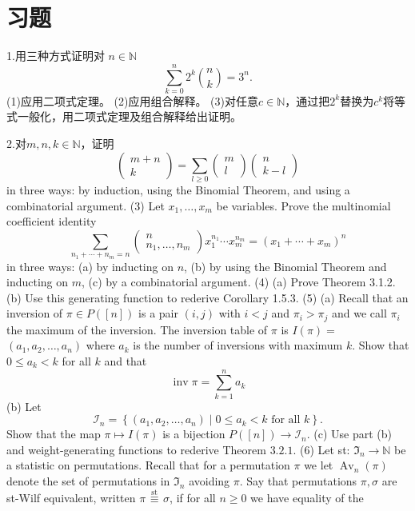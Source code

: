 \documentclass[a4paper,12pt]{ctexbook}
\begin{document}
\section{习题}
1.用三种方式证明对 $n \in \mathbb{N}$
$$
\sum_{k=0}^{n} 2^{k}\binom{n}{k}=3^{n}.
$$
(1)应用二项式定理。
(2)应用组合解释。
(3)对任意$c \in \mathbb{N}$，通过把$2^{k}$替换为$c^{k}$将等式一般化，用二项式定理及组合解释给出证明。

2.对$m, n, k \in \mathbb{N}$，证明
$$
\left(\begin{array}{c}
m+n \\
k
\end{array}\right)=\sum_{l \geq 0}\left(\begin{array}{c}
m \\
l
\end{array}\right)\left(\begin{array}{c}
n \\
k-l
\end{array}\right)
$$
in three ways: by induction, using the Binomial Theorem, and using a combinatorial argument.
(3) Let $x_{1}, \ldots, x_{m}$ be variables. Prove the multinomial coefficient identity
$$
\sum_{n_{1}+\cdots+n_{m}=n}\left(\begin{array}{c}
n \\
n_{1}, \ldots, n_{m}
\end{array}\right) x_{1}^{n_{1}} \cdots x_{m}^{n_{m}}=\left(x_{1}+\cdots+x_{m}\right)^{n}
$$
in three ways:
(a) by inducting on $n$,
(b) by using the Binomial Theorem and inducting on $m$,
(c) by a combinatorial argument.
(4) (a) Prove Theorem 3.1.2.
(b) Use this generating function to rederive Corollary 1.5.3.
(5) (a) Recall that an inversion of $\pi \in P([n])$ is a pair $(i, j)$ with $i<j$ and $\pi_{i}>\pi_{j}$ and we call $\pi_{i}$ the maximum of the inversion. The inversion table of $\pi$ is $I(\pi)=$ $\left(a_{1}, a_{2}, \ldots, a_{n}\right)$ where $a_{k}$ is the number of inversions with maximum $k$. Show that $0 \leq a_{k}<k$ for all $k$ and that
$$
\operatorname{inv} \pi=\sum_{k=1}^{n} a_{k}
$$
(b) Let
$$
\mathcal{I}_{n}=\left\{\left(a_{1}, a_{2}, \ldots, a_{n}\right) \mid 0 \leq a_{k}<k \text { for all } k\right\} .
$$
Show that the map $\pi \mapsto I(\pi)$ is a bijection $P([n]) \rightarrow \mathcal{I}_{n}$.
(c) Use part (b) and weight-generating functions to rederive Theorem $3.2 .1$.
(6) Let st: $\Im_{n} \rightarrow \mathbb{N}$ be a statistic on permutations. Recall that for a permutation $\pi$ we let $\operatorname{Av}_{n}(\pi)$ denote the set of permutations in $\Im_{n}$ avoiding $\pi$. Say that permutations $\pi, \sigma$ are st-Wilf equivalent, written $\pi \stackrel{\text { st }}{\equiv} \sigma$, if for all $n \geq 0$ we have equality of the
\end{document}
